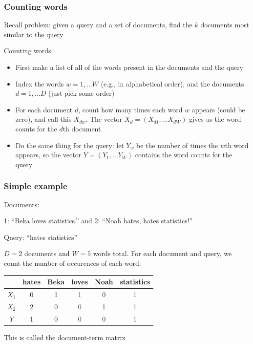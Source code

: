 \documentclass[mathserif]{beamer}
\def\red{\color[rgb]{0.8,0,0}}
\begin{document}
\begin{frame}
\frametitle{Counting words}
Recall problem: given a query and a set of documents, 
find the $k$ documents most similar to the query

\bigskip
Counting words:
\begin{itemize}
\item First make a list of all of the words present in the 
documents and the query
\item
Index the words $w = 1,\ldots W$ (e.g., in alphabetical 
order), and the documents $d=1,\ldots D$ (just pick some 
order)
\item For each document $d$, count how many times
each word $w$ appears (could be zero), and call this $X_{dw}$. 
The vector $X_d = (X_{d1},\ldots X_{dW})$ gives 
us the {\red word counts} for the $d$th document
\item Do the same thing for the query: let $Y_w$ be the number of  
times the $w$th word appears, so the vector $Y=(Y_1,\ldots Y_W)$
contains the word counts for the query
\end{itemize}
\end{frame}

\begin{frame}
\frametitle{Simple example}
{\red Documents}: 
\begin{center}
1: ``Beka loves statistics.'' and 
2: ``Noah hates, hates statistics!''
\end{center}
{\red Query}: ``hates statistics''

\bigskip
$D=2$ documents and $W=5$ words total.
For each document and query, we count the number of 
occurences of each word:

\begin{center}
\begin{tabular}{|c|c|c|c|c|c|}
\hline
 & hates & Beka & loves & Noah & statistics \\
\hline
$X_1$ & 0 & 1 & 1 & 0 & 1 \\
\hline
$X_2$ & 2 & 0 & 0 & 1 & 1 \\
\hline
$Y$ & 1 & 0 & 0 & 0 & 1 \\
\hline
\end{tabular}
\end{center}

\smallskip
This is called the {\red document-term} matrix
\end{frame}
\end{document}
